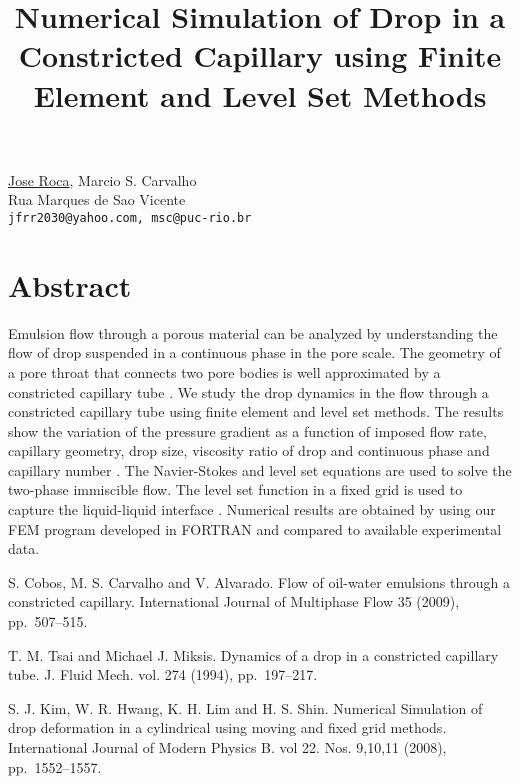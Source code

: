 \title{Numerical Simulation of Drop in a Constricted Capillary using Finite Element and Level Set Methods}
\author{} \institute{}
\maketitle

\begin{center}
{\large \underline{Jose Roca}, Marcio S. Carvalho}\\
Rua Marques de Sao Vicente\\
{\tt jfrr2030@yahoo.com, msc@puc-rio.br}
\end{center}

\section*{Abstract}
Emulsion flow through a porous material can be analyzed by understanding the flow of drop suspended in a continuous phase in the pore scale. The geometry of a pore throat that connects two pore bodies is well approximated by a constricted capillary tube \cite{Carvalho01}. We study the drop dynamics in the flow through a constricted capillary tube using finite element and level set methods. The results show the variation of the pressure gradient as a function of imposed flow rate, capillary geometry, drop size, viscosity ratio of drop and continuous phase and capillary number \cite{Tsai01}. The Navier-Stokes and level set equations are used to solve the two-phase immiscible flow. The level set function in a fixed grid is used to capture the liquid-liquid interface \cite{Kim01}. Numerical results are obtained by using our FEM program developed in FORTRAN and compared to available experimental data.


\begin{thebibliography}{10}
{\sc S. Cobos, M. S. Carvalho and V. Alvarado}. {Flow of oil-water emulsions through a constricted capillary}. International Journal of Multiphase Flow 35 (2009), pp.~507--515.

{\sc T. M. Tsai and Michael J. Miksis}. {Dynamics of a drop in a constricted capillary tube}. J. Fluid Mech. vol. 274 (1994), pp.~197--217.

{\sc S. J. Kim, W. R. Hwang, K. H. Lim and H. S. Shin}. {Numerical Simulation of drop deformation in a cylindrical using moving and fixed grid methods}. International Journal of Modern Physics B. vol 22. Nos. 9,10,11 (2008), pp.~1552--1557.
\end{thebibliography}